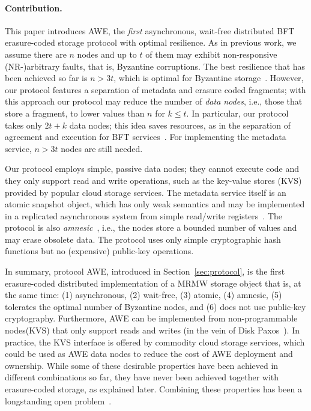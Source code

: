 \documentclass[oribibl]{llncs}
\theoremstyle{definition-boldhead}
\newcommand{\NAME}{AWE\xspace}
\newcommand{\nodes}{nodes\xspace}
\begin{document}
\paragraph{Contribution.}
This paper introduces \NAME, the \emph{first} asynchronous, wait-free
distributed BFT erasure-coded storage protocol with optimal
resilience.   As in
previous work, we assume there are $n$ \nodes and up to $t$ of them
may exhibit non-responsive (NR-)arbitrary faults, that is, Byzantine
corruptions.  The best resilience that has been achieved so far is $n
> 3t$, which is optimal for Byzantine storage~\cite{maalda02}.
However, our protocol features a separation of metadata and erasure coded fragments; with this approach our protocol may reduce the
number of \emph{data \nodes}, i.e., those that store a fragment, to
lower values than $n$ for $k \leq t$.  In particular, our protocol takes only
$2t+k$ data \nodes; this idea saves resources, as in the separation
of agreement and execution for BFT services~\cite{ymvad03}.  For
implementing the metadata service, $n > 3t$ \nodes are still
needed.

Our protocol
employs simple, passive data \nodes; they cannot execute code and they
only support read and write operations, such as the key-value stores
(KVS) provided by popular cloud storage services.  The metadata
service itself is an atomic snapshot object, which has only weak
semantics and may be implemented in a replicated asynchronous system
from simple read/write registers~\cite{aadgms93}.  The protocol is
also \emph{amnesic}~\cite{chguke07}, i.e., the \nodes store a
bounded number of values and may erase obsolete data.
The protocol uses only simple cryptographic
hash functions but no (expensive) public-key operations.

In summary, protocol \NAME, introduced in Section~\ref{sec:protocol}, is the first
erasure-coded distributed implementation of a MRMW storage object that
is, at the same time: (1) asynchronous, (2) wait-free, (3) atomic, (4) amnesic, (5) tolerates the optimal number of Byzantine \nodes, and (6) does not use public-key
cryptography.  Furthermore, \NAME can be
implemented from non-programmable \nodes (KVS) that only support reads and
writes (in the vein of Disk Paxos~\cite{ackm06}). In practice, the KVS interface is offered by commodity cloud storage services, which could be used as \NAME data \nodes
to reduce the cost of \NAME deployment and ownership.
While some of these desirable properties have been achieved in different combinations so far, they have never been achieved together with erasure-coded storage, as explained later.  Combining these properties has been a longstanding open problem~\cite{gwgr04}.
\end{document}
